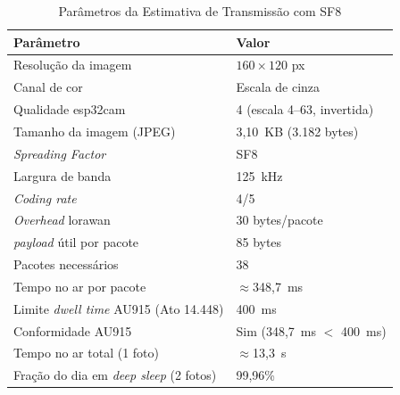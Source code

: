 \begin{table}[htbp]
  \centering
  \caption{Parâmetros da Estimativa de Transmissão com SF8}
  \label{tab:parametros}
  \begin{tabular}{ll}
    \toprule
    \textbf{Parâmetro}                                  & \textbf{Valor}              \\
    \midrule
    Resolução da imagem                                 & $160 \times 120$ px         \\
    Canal de cor                                        & Escala de cinza             \\
    Qualidade \gls{esp32cam}                                 & 4 (escala 4--63, invertida) \\
    Tamanho da imagem (JPEG)                            & 3,10~KB (3.182 bytes)       \\
    \textit{Spreading Factor}                           & SF8                         \\
    Largura de banda                                    & 125~kHz                     \\
    \textit{Coding rate}                                & 4/5                         \\
    \textit{Overhead} \gls{lorawan}                           & 30 bytes/pacote             \\
    \textit{\gls{payload}} útil por pacote                    & 85 bytes                    \\
    Pacotes necessários                                 & 38                          \\
    Tempo no ar por pacote                              & $\approx$348,7~ms           \\
    Limite \textit{dwell time} AU915 (Ato 14.448)       & 400~ms                      \\
    Conformidade AU915                                  & Sim (348,7~ms $<$ 400~ms)   \\
    Tempo no ar total (1 foto)                          & $\approx$13,3~s             \\
    Fração do dia em \textit{deep sleep} (2 fotos)      & 99,96\%                     \\
    \bottomrule
  \end{tabular}
\end{table}
 

